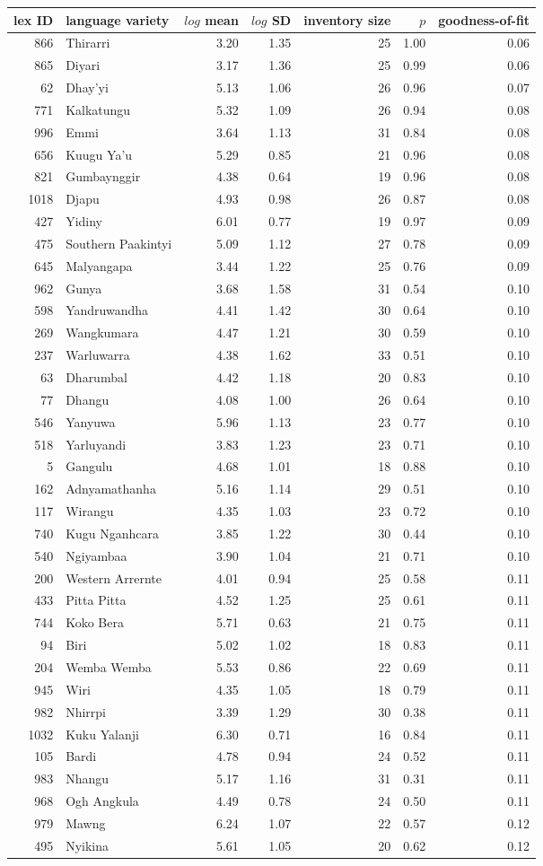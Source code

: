 \begin{longtable}[]{@{}rlrrrrr@{}}
\toprule
\textbf{lex ID} & \textbf{language variety} & \(log\) \textbf{mean} &
\(log\) \textbf{SD} & \textbf{inventory size} & \(p\) &
\textbf{goodness-of-fit}\tabularnewline
\midrule
\endhead
866 & Thirarri & 3.20 & 1.35 & 25 & 1.00 & 0.06\tabularnewline
865 & Diyari & 3.17 & 1.36 & 25 & 0.99 & 0.06\tabularnewline
62 & Dhay'yi & 5.13 & 1.06 & 26 & 0.96 & 0.07\tabularnewline
771 & Kalkatungu & 5.32 & 1.09 & 26 & 0.94 & 0.08\tabularnewline
996 & Emmi & 3.64 & 1.13 & 31 & 0.84 & 0.08\tabularnewline
656 & Kuugu Ya'u & 5.29 & 0.85 & 21 & 0.96 & 0.08\tabularnewline
821 & Gumbaynggir & 4.38 & 0.64 & 19 & 0.96 & 0.08\tabularnewline
1018 & Djapu & 4.93 & 0.98 & 26 & 0.87 & 0.08\tabularnewline
427 & Yidiny & 6.01 & 0.77 & 19 & 0.97 & 0.09\tabularnewline
475 & Southern Paakintyi & 5.09 & 1.12 & 27 & 0.78 & 0.09\tabularnewline
645 & Malyangapa & 3.44 & 1.22 & 25 & 0.76 & 0.09\tabularnewline
962 & Gunya & 3.68 & 1.58 & 31 & 0.54 & 0.10\tabularnewline
598 & Yandruwandha & 4.41 & 1.42 & 30 & 0.64 & 0.10\tabularnewline
269 & Wangkumara & 4.47 & 1.21 & 30 & 0.59 & 0.10\tabularnewline
237 & Warluwarra & 4.38 & 1.62 & 33 & 0.51 & 0.10\tabularnewline
63 & Dharumbal & 4.42 & 1.18 & 20 & 0.83 & 0.10\tabularnewline
77 & Dhangu & 4.08 & 1.00 & 26 & 0.64 & 0.10\tabularnewline
546 & Yanyuwa & 5.96 & 1.13 & 23 & 0.77 & 0.10\tabularnewline
518 & Yarluyandi & 3.83 & 1.23 & 23 & 0.71 & 0.10\tabularnewline
5 & Gangulu & 4.68 & 1.01 & 18 & 0.88 & 0.10\tabularnewline
162 & Adnyamathanha & 5.16 & 1.14 & 29 & 0.51 & 0.10\tabularnewline
117 & Wirangu & 4.35 & 1.03 & 23 & 0.72 & 0.10\tabularnewline
740 & Kugu Nganhcara & 3.85 & 1.22 & 30 & 0.44 & 0.10\tabularnewline
540 & Ngiyambaa & 3.90 & 1.04 & 21 & 0.71 & 0.10\tabularnewline
200 & Western Arrernte & 4.01 & 0.94 & 25 & 0.58 & 0.11\tabularnewline
433 & Pitta Pitta & 4.52 & 1.25 & 25 & 0.61 & 0.11\tabularnewline
744 & Koko Bera & 5.71 & 0.63 & 21 & 0.75 & 0.11\tabularnewline
94 & Biri & 5.02 & 1.02 & 18 & 0.83 & 0.11\tabularnewline
204 & Wemba Wemba & 5.53 & 0.86 & 22 & 0.69 & 0.11\tabularnewline
945 & Wiri & 4.35 & 1.05 & 18 & 0.79 & 0.11\tabularnewline
982 & Nhirrpi & 3.39 & 1.29 & 30 & 0.38 & 0.11\tabularnewline
1032 & Kuku Yalanji & 6.30 & 0.71 & 16 & 0.84 & 0.11\tabularnewline
105 & Bardi & 4.78 & 0.94 & 24 & 0.52 & 0.11\tabularnewline
983 & Nhangu & 5.17 & 1.16 & 31 & 0.31 & 0.11\tabularnewline
968 & Ogh Angkula & 4.49 & 0.78 & 24 & 0.50 & 0.11\tabularnewline
979 & Mawng & 6.24 & 1.07 & 22 & 0.57 & 0.12\tabularnewline
495 & Nyikina & 5.61 & 1.05 & 20 & 0.62 & 0.12\tabularnewline

\end{longtable}
